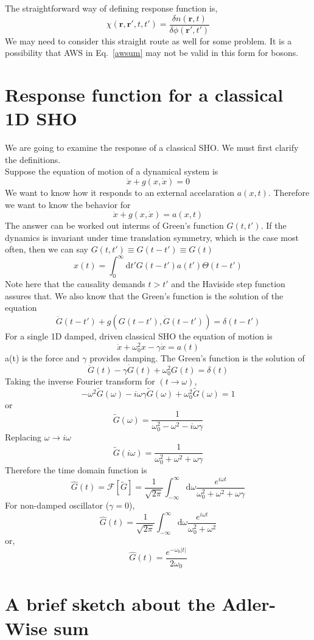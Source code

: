 \documentclass[jcp,groupaddress]{revtex4-1}
\newcommand{\eq}{\begin{equation}}
\newcommand{\qe}{\end{equation}}
\newcommand{\diff}{\mathrm{d}}
\newcommand{\rr}{\mathbf{r}}
\newcommand{\abs}[1]{\vert #1\vert}
\begin{document}
The straightforward way of defining response function is,
\eq
 \chi(\rr,\rr',t,t') = \frac{\delta n(\rr,t)}{\delta \phi(\rr',t')}
\qe 
We may need to consider this straight route as well for some problem. It is a possibility that  AWS in Eq.~\eqref{awsum} may not be valid in this form for bosons. 
\section{Response function for a classical 1D SHO}
We are going to examine the response of a classical SHO. We must first clarify the definitions. \\
Suppose the equation of motion of a dynamical system is 
\eq
\ddot{x}+ g(x, \dot{x})=0
\qe
We want to know how it responds to an external accelaration $a(x,t)$. Therefore we want to know the behavior for 
\eq
\ddot{x}+ g(x, \dot{x})=a(x,t)
\qe
The answer can be worked out interms of Green's function $G(t, t')$. If the dynamics is invariant under time translation symmetry, which is the case most often, then we can say $G(t, t')\equiv G( t-t') \equiv G(t)$
\eq
x(t) = \int_{0}^{\infty}\diff t' G(t-t') a(t')\Theta(t-t')
\qe
Note here that the causality demands $t> t'$ and the Haviside step function assures that. We also know that the Green's function is the solution of the equation
\eq
\ddot{G}(t-t')+ g(G( t-t'), \dot{G}(t-t')) = \delta(t-t')
\qe
For a single 1D damped, driven classical SHO the equation of motion is 
\eq
\ddot{x} + \omega_{0}^{2}x -\gamma \dot{x} = a(t)
\qe
a(t) is the force and $\gamma$ provides damping.  The Green's function is the solution of
\eq
\ddot{G}(t)-\gamma \dot{G}(t)+ \omega_{0}^{2}G(t) = \delta(t)
\qe
Taking the inverse Fourier transform for $(t \to \omega)$, 
\eq
-\omega^2 \tilde{G}(\omega)-i\omega \gamma \tilde{G}(\omega)+ \omega_{0}^{2}\tilde{G}(\omega) = 1
\qe
or
\eq
\tilde{G}(\omega) = \frac{1}{\omega_{0}^{2}-\omega^{2}-i\omega \gamma}
\qe
Replacing $\omega \to i \omega$ 
\eq
\tilde{G}(i\omega) = \frac{1}{\omega_{0}^{2}+\omega^{2}+\omega \gamma}
\qe
Therefore the time domain function is 
\eq
\hat{G}(t) = \mathcal{F}[\tilde{G}] = \frac{1}{\sqrt{2\pi}}\int_{-\infty}^{\infty} \diff \omega \frac{e^{i\omega t}}{\omega_{0}^{2}+\omega^{2}+\omega \gamma}
\qe
For non-damped oscillator ($\gamma =0$),
\eq
\hat{G}(t) = \frac{1}{\sqrt{2\pi}}\int_{-\infty}^{\infty} \diff \omega \frac{e^{i\omega t}}{\omega_{0}^{2}+\omega^{2}}
\qe 
or,
\eq
\hat{G}(t) = \frac{e^{-\omega_{0} \abs{t}}}{2\omega_{0}} 
\qe 
\section{A brief sketch about the Adler-Wise sum}
\end{document}
